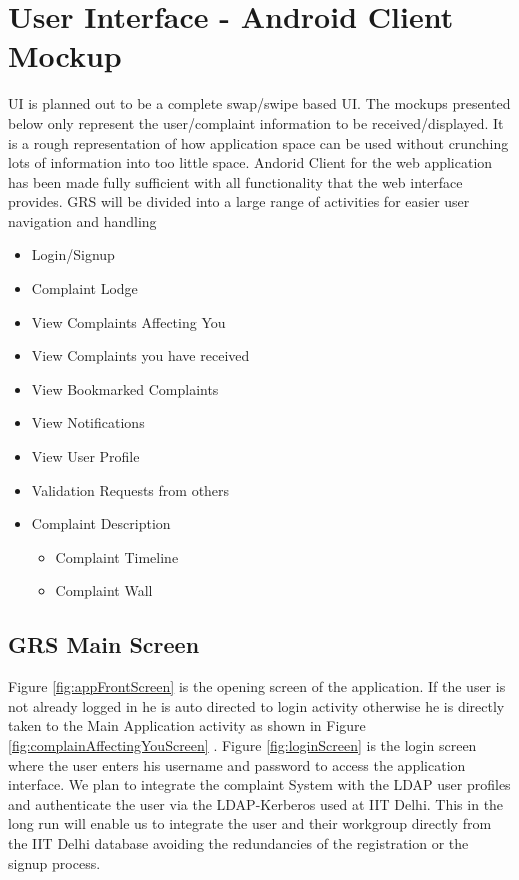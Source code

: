 \documentclass[12pt]{article}
\begin{document}
\section{User Interface - Android Client Mockup}
\par
UI is planned out to be a complete swap/swipe based UI. The mockups presented below only represent the user/complaint information to be received/displayed. It is a rough representation of how application space can be used without crunching lots of information into too little space. Andorid Client for the web application has been made fully sufficient with all functionality that the web interface provides. GRS will be divided into a large range of activities for easier user navigation and handling
\begin{itemize}
  \item Login/Signup
  \item Complaint Lodge
  \item View Complaints Affecting You
  \item View Complaints you have received
  \item View Bookmarked Complaints
  \item View Notifications
  \item View User Profile
  \item Validation Requests from others
  \item Complaint Description
      \begin{itemize}
      \item Complaint Timeline
          \item Complaint Wall
    \end{itemize}
    
\end{itemize}


    \subsection{GRS Main Screen}
    \par
    Figure \ref{fig:appFrontScreen} is the opening screen of the application. If the user is not already logged in he is auto directed to login activity otherwise he is directly taken to the Main Application activity as shown in Figure \ref{fig:complainAffectingYouScreen} . Figure \ref{fig:loginScreen} is the login screen where the user enters his username and password to access the application interface. We plan to integrate the complaint System with the LDAP user profiles and authenticate the user via the LDAP-Kerberos used at IIT Delhi. This in the long run will enable us to integrate the user and their workgroup directly from the IIT Delhi database avoiding the redundancies of the registration or the signup process.
\end{document}
